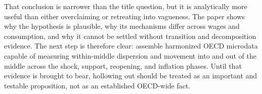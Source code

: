 \documentclass[11pt]{article}
\begin{document}
That conclusion is narrower than the title question, but it is analytically more useful than either overclaiming or retreating into vagueness. The paper shows why the hypothesis is plausible, why its mechanisms differ across wages and consumption, and why it cannot be settled without transition and decomposition evidence. The next step is therefore clear: assemble harmonized OECD microdata capable of measuring within-middle dispersion and movement into and out of the middle across the shock, support, reopening, and inflation phases. Until that evidence is brought to bear, hollowing out should be treated as an important and testable proposition, not as an established OECD-wide fact.



\end{document}

